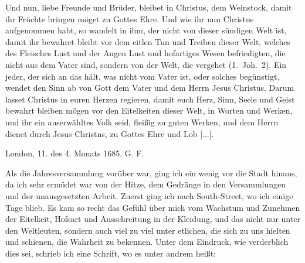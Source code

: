 {    Und nun, liebe Freunde und Brüder, bleibet in Christus,
    dem Weinstock, damit ihr Früchte bringen möget zu Gottes Ehre.
    Und wie ihr nun Christus aufgenommen habt, so wandelt in ihm,
    der nicht von dieser sündigen Welt ist, damit ihr bewahret bleibt
    vor dem eitlen Tun und Treiben dieser Welt, welches des Fleisches
    Lust und der Augen Lust und hofartiges Wesen befriedigten, die
    nicht aus dem Vater sind, sondern von der Welt, die vergehet
    (1.~Joh.~2). Ein jeder, der 
    sich an das hält, was nicht vom
    Vater ist, oder solches begünstigt, wendet den Sinn ab von Gott
    dem Vater und dem Herrn Jesus Christus. Darum lasset
    Christus in euren Herzen regieren, damit euch Herz, Sinn,
    Seele und Geist bewahrt bleiben mögen vor den Eitelkeiten dieser
    Welt, in Worten und Werken, und ihr ein auserwähltes Volk
    seid, fleißig zu guten Werken, und dem Herrn dienet durch Jesus
    Christns, zu Gottes Ehre und Lob [...].
    \bigskip
    \begin{flushright}
    London, 11. des 4. Monats 1685. G. F.\end{flushright}
}

Als die Jahresversammlung vorüber war, ging ich ein wenig
vor die Stadt hinaus, da ich sehr ermüdet war von der Hitze,
dem Gedränge in den Versammlungen und der unausgesetzten
Arbeit. Zuerst ging ich nach South-Street, wo ich einige Tage
blieb. Es kam so recht das Gefühl über mich vom Wachstum
und Zunehmen der Eitelkeit, 
Hofsart und Ausschreitung in der
Kleidung, und das nicht nur unter den Weltleuten, sondern
auch viel zu viel unter etlichen, die sich zu uns hielten und schienen,
die Wahrheit zu bekennen. Unter dem Eindruck, wie verderblich
dies sei, schrieb ich eine Schrift, wo es unter andrem heißt:


